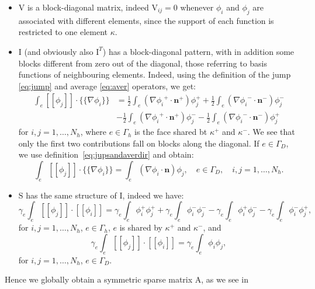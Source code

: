 \documentclass[12pt, a4paper]{article}
\theoremstyle{definition}
\theoremstyle{plain}
\theoremstyle{plain}
\theoremstyle{definition}
\begin{document}
\begin{itemize}
	\item $\mathrm{V}$ is a block-diagonal matrix, indeed 
	$\mathrm{V}_{ij} = 0$ 
	whenever $\phi_i$ and $\phi_j$ are associated with different elements, 
	since the support of each function is restricted to one element $\kappa$.
	\item $\mathrm{I}$ (and obviously also $\mathrm{I}^T$) has a block-diagonal 
	pattern, with in addition some blocks different from zero out of the 
	diagonal, those referring to basis functions of neighbouring elements. 
	Indeed, using the definition of the jump \eqref{eq:jump} and average 
	\eqref{eq:aver} operators, we get:
	\begin{align*}
		\int_e [\![\phi_j]\!] \cdot \{\!\!\{ \nabla \phi_i \}\!\!\} &=
		\frac{1}{2} \int_e (\nabla{\phi_i}^+ \cdot \mathbf{n}^+ )\phi_j^+
		+ \frac{1}{2} \int_e (\nabla{\phi_i}^- \cdot \mathbf{n}^- )\phi_j^-\\
		&- \frac{1}{2} \int_e (\nabla{\phi_i}^+ \cdot \mathbf{n}^+ )\phi_j^-
		- \frac{1}{2} \int_e (\nabla{\phi_i}^- \cdot \mathbf{n}^- )\phi_j^+
	\end{align*}
	for $i,j = 1,\dots, N_h$, where $e \in \Gamma_h$ is the face shared bt 
	$\kappa^+$ and $\kappa^-$. We see that only the first two contributions 
	fall on blocks along the diagonal. If $e \in \Gamma_D$, we use 
	definition~\eqref{eq:jupsandaverdir} and obtain:
	\begin{equation*}
		\int_e [\![\phi_j]\!] \cdot \{\!\!\{ \nabla \phi_i \}\!\!\} = \int_e 
		(\nabla{\phi_i} \cdot \mathbf{n} )\phi_j, \quad e \in \Gamma_{D}, 
		\quad i,j = 1,\dots, N_h.
	\end{equation*}
	\item $\mathrm{S}$ has the same structure of $\mathrm{I}$, indeed we 
	have:
	\begin{equation*}
		\gamma_e \int_e [\![\phi_j]\!] \cdot [\![\phi_i]\!] =
		\gamma_e \int_e \phi_i^+ \phi_j^+
		+ \gamma_e \int_e \phi_i^- \phi_j^-
		- \gamma_e \int_e \phi_i^+ \phi_j^-
		- \gamma_e \int_e \phi_i^- \phi_j^+,
	\end{equation*}
	for $i,j = 1,\dots, N_h$,  $e \in \Gamma_h$, $e$ is shared by $\kappa^+$ 
	and 
	$\kappa^-$, and
	\begin{equation*}
		\gamma_e \int_e [\![\phi_j]\!] \cdot [\![\phi_i]\!] =
		\gamma_e \int_e \phi_i \phi_j,
	\end{equation*}
	for $i,j = 1,\dots,N_h$, $e \in \Gamma_D$.
\end{itemize}
Hence we globally obtain a symmetric sparse matrix $\mathrm{A}$, as we see in 
\end{document}
